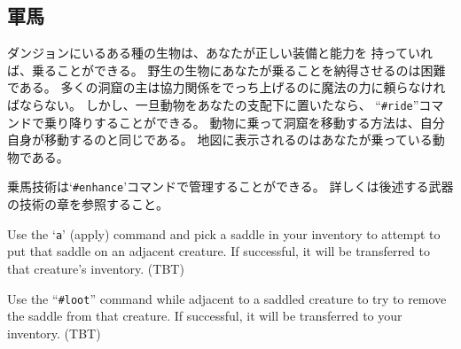\subsection*{軍馬}

ダンジョンにいるある種の生物は、あなたが正しい装備と能力を
持っていれば、乗ることができる。
野生の生物にあなたが乗ることを納得させるのは困難である。
多くの洞窟の主は協力関係をでっち上げるのに魔法の力に頼らなければならない。
しかし、一旦動物をあなたの支配下に置いたなら、
``{\tt \#ride}''コマンドで乗り降りすることができる。
動物に乗って洞窟を移動する方法は、自分自身が移動するのと同じである。
地図に表示されるのはあなたが乗っている動物である。

乗馬技術は`{\tt \#enhance}'コマンドで管理することができる。
詳しくは後述する武器の技術の章を参照すること。

Use the `{\tt a}' (apply) command and pick a saddle in your inventory to
attempt to put that saddle on an adjacent creature.  If successful,
it will be transferred to that creature's inventory.
(TBT)

Use the ``{\tt \#loot}'' command while adjacent to a saddled creature to
try to remove the saddle from that creature.  If successful, it will
be transferred to your inventory.
(TBT)

